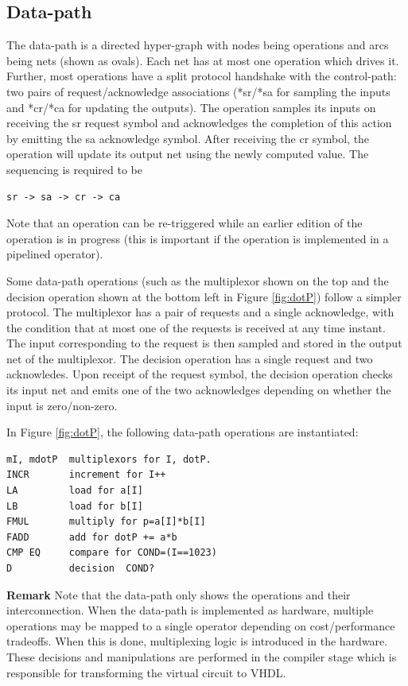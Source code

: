 \documentclass[conference]{IEEEtran}
\begin{document}
\subsection{Data-path}
The data-path is a directed hyper-graph with nodes being
operations and arcs being nets (shown as ovals).  Each
net has at most one operation which drives it.  Further, most
operations have  a split protocol handshake with
the control-path:  two pairs of request/acknowledge 
associations (*sr/*sa for sampling the inputs  and *cr/*ca for
updating the outputs).    The operation samples its inputs
on receiving the sr request symbol and acknowledges the completion
of this action by emitting the sa acknowledge symbol.  After receiving
the cr symbol, the operation will update its output net
using the newly computed value. The sequencing is required to be
\begin{verbatim}
sr -> sa -> cr -> ca
\end{verbatim}
Note that an operation can be re-triggered while an earlier
edition of the operation
is in progress (this is important if the operation is implemented
in a pipelined operator).

Some data-path operations (such as the multiplexor
shown on the top and the decision operation shown at the bottom
left in Figure \ref{fig:dotP}) follow a simpler protocol.  The multiplexor
has a pair of requests and a single acknowledge, with the condition
that at most one of the requests is received at any time instant.
The input corresponding to the request is then sampled and stored
in the output net of the multiplexor.
The decision operation has a single request and two acknowledes.  Upon
receipt of the request symbol, the decision operation checks its input net
and emits one of the two acknowledges depending on whether the input
is zero/non-zero.

In Figure \ref{fig:dotP}, the following data-path operations
are instantiated:
\begin{verbatim}
mI, mdotP  multiplexors for I, dotP.
INCR       increment for I++
LA         load for a[I]
LB         load for b[I]
FMUL       multiply for p=a[I]*b[I]
FADD       add for dotP += a*b
CMP EQ     compare for COND=(I==1023)
D          decision  COND?
\end{verbatim}


\noindent
{\bf Remark}
Note that the data-path only shows the operations and their interconnection.
When the data-path is implemented as hardware, multiple operations may
be mapped to a single operator depending on cost/performance tradeoffs.  When
this is done, multiplexing logic is introduced in the hardware.  These
decisions and manipulations are performed in the compiler stage which is
responsible for transforming the virtual circuit to VHDL.
\end{document}
